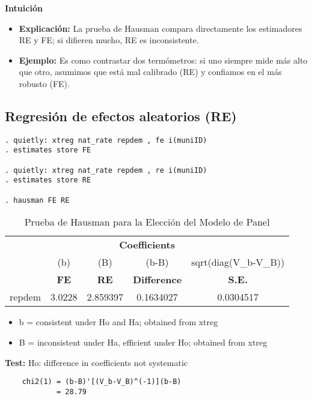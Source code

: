 \documentclass[12pt]{article}
\begin{document}
\noindent\textbf{Intuición}
\begin{itemize}
    \item \textbf{Explicación:} La prueba de Hausman compara directamente los estimadores RE y FE; si difieren mucho, RE es inconsistente.
    \item \textbf{Ejemplo:} Es como contrastar dos termómetros: si uno siempre mide más alto que otro, asumimos que está mal calibrado (RE) y confiamos en el más robusto (FE).
\end{itemize}

\subsection*{\noindent\textbf{Regresión de efectos aleatorios (RE)}}

\begin{verbatim}
. quietly: xtreg nat_rate repdem , fe i(muniID)
. estimates store FE

. quietly: xtreg nat_rate repdem , re i(muniID)
. estimates store RE

. hausman FE RE
\end{verbatim}

\begin{table}[H] %
    \centering
    \caption{Prueba de Hausman para la Elección del Modelo de Panel}
    \begin{tabular}{l c c c c}
        \multicolumn{5}{c}{\hrulefill \textbf{Coefficients} \hrulefill} \\
        & (b) & (B) & (b-B) & sqrt(diag(V\_b-V\_B)) \\
        & \textbf{FE} & \textbf{RE} & \textbf{Difference} & \textbf{S.E.} \\
        \hline
        repdem & 3.0228 & 2.859397 & 0.1634027 & 0.0304517 \\
        \hline
    \end{tabular}

    \vspace{0.2cm}
    \begin{itemize}
        \item[] b = consistent under Ho and Ha; obtained from xtreg
        \item[] B = inconsistent under Ha, efficient under Ho; obtained from xtreg
    \end{itemize}

    \vspace{0.2cm}
    \noindent\textbf{Test:} Ho: difference in coefficients not systematic

    \begin{verbatim}
    chi2(1) = (b-B)'[(V_b-V_B)^(-1)](b-B)
            = 28.79
    \end{verbatim}
\end{table}
\end{document}
